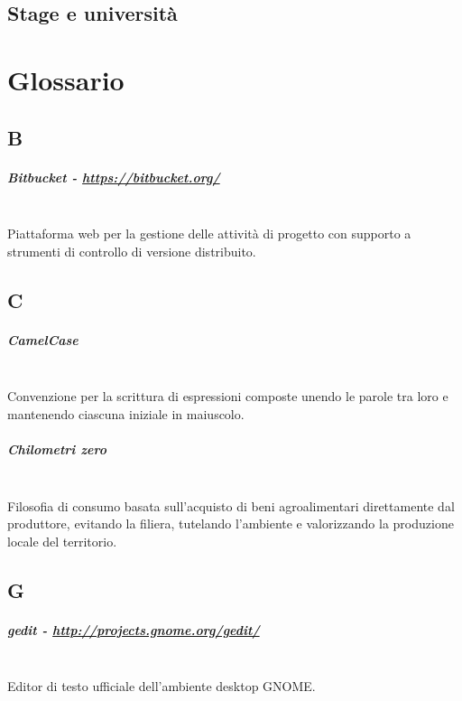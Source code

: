\documentclass[11pt,a4paper,headsepline,hidelinks]{scrreprt} %
\begin{document}
	\section{Stage e università}

	\appendix
	\chapter[Glossario]{Glossario}
	\label{ch:appendice:glossario}
	
	\section*{B}
	\paragraph{Bitbucket - \url{https://bitbucket.org/}} \hfill \\
	Piattaforma web per la gestione delle attività di progetto con supporto a strumenti di controllo di versione distribuito.

	\section*{C}
	\paragraph{CamelCase} \hfill \\
	Convenzione per la scrittura di espressioni composte unendo le parole tra loro e mantenendo ciascuna iniziale in maiuscolo.
	
	\paragraph{Chilometri zero} \hfill \\
	Filosofia di consumo basata sull'acquisto di beni agroalimentari direttamente dal produttore, evitando la filiera, tutelando l'ambiente e valorizzando la produzione locale del territorio.

	\section*{G}
	\paragraph{gedit - \url{http://projects.gnome.org/gedit/}} \hfill \\
	Editor di testo ufficiale dell'ambiente desktop GNOME.
\end{document}
